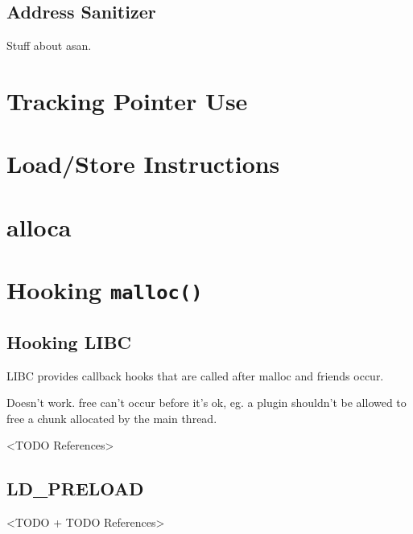 \subsection {Address Sanitizer}

Stuff about asan.

\section {Tracking Pointer Use}

\section {Load/Store Instructions}

\section {alloca}

\section {Hooking \texttt{malloc()}}

\subsection {Hooking LIBC}

LIBC provides callback hooks that are called after malloc and friends occur.

Doesn't work. free can't occur before it's ok, eg. a plugin shouldn't be
allowed to free a chunk allocated by the main thread.

<TODO References>

\subsection {LD\_PRELOAD}

<TODO + TODO References>
